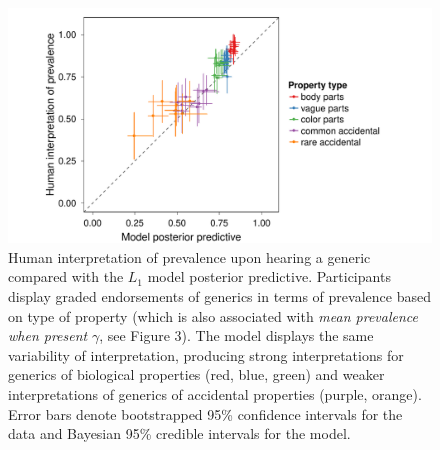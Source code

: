 \documentclass{pnastwo}
\begin{document}
\begin{article}




\begin{figure}
\centering
    \includegraphics[width=0.7\columnwidth]{implied-byItem-mh100kX2.pdf}
    \caption{Human interpretation of prevalence upon hearing a generic compared with the $L_1$ model posterior predictive. 
    Participants display graded endorsements of generics in terms of prevalence based on type of property (which is also associated with \emph{mean prevalence when present} $\gamma$, see Figure 3).
    The model displays the same variability of interpretation, producing strong interpretations for generics of biological properties (red, blue, green) and weaker interpretations of generics of accidental properties (purple, orange).
        Error bars denote bootstrapped 95\% confidence intervals for the data and Bayesian 95\% credible intervals for the model.}
  \label{fig:impliedByItem}
\end{figure}







\end{article}
\end{document}
